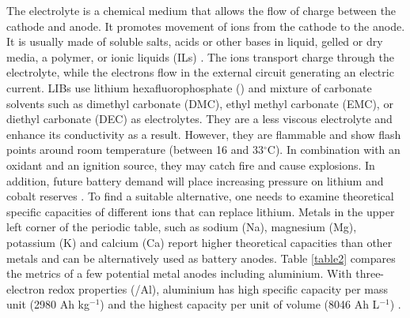\vspace{3mm}
The electrolyte is a chemical medium that allows the flow of charge between the cathode and anode. It promotes movement of ions from the cathode to the anode. It is usually made of soluble salts, acids or other bases in liquid, gelled or dry media, a polymer, or ionic liquids (ILs) \cite{xu_nonaqueous_2004, armand_ionic-liquid_2009, croce_nanocomposite_1998}. The ions transport charge through the electrolyte, while the electrons flow in the external circuit generating an electric current. LIBs use lithium hexafluorophosphate () and mixture of carbonate solvents such as dimethyl carbonate (DMC), ethyl methyl carbonate (EMC), or diethyl carbonate (DEC) as electrolytes. They are a less viscous electrolyte and enhance its conductivity as a result. However, they are flammable and show flash points around room temperature (between 16 and 33$^{\circ}$C). In combination with an oxidant and an ignition source, they may catch fire and cause explosions. In addition, future battery demand will place increasing pressure on lithium and cobalt reserves \cite{turcheniuk_ten_2018}. To find a suitable alternative, one needs to examine theoretical specific capacities of different ions that can replace lithium. Metals in the upper left corner of the periodic table, such as sodium (Na), magnesium (Mg), potassium (K) and calcium (Ca) report higher theoretical capacities than other metals and can be alternatively used as battery anodes. Table  \ref{table2} compares the metrics of a few potential metal anodes including aluminium. With three-electron redox properties (/Al), aluminium has high specific capacity per mass unit (2980 Ah kg$^{-1}$) and the highest capacity per unit of volume (8046 Ah L$^{-1}$) \cite{ambroz_trends_2017}.

